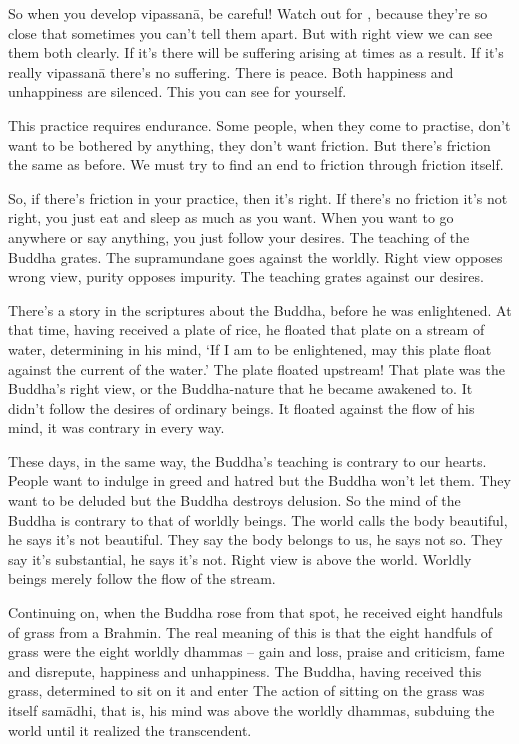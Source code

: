 So when you develop vipassan\=a, be careful! Watch out for , because they're so close that sometimes you can't tell them apart. But with right view we can see them both clearly. If it's  there will be suffering arising at times as a result. If it's really vipassan\=a there's no suffering. There is peace. Both happiness and unhappiness are silenced. This you can see for yourself. 

This practice requires endurance. Some people, when they come to practise, don't want to be bothered by anything, they don't want friction. But there's friction the same as before. We must try to find an end to friction through friction itself. 

So, if there's friction in your practice, then it's right. If there's no friction it's not right, you just eat and sleep as much as you want. When you want to go anywhere or say anything, you just follow your desires. The teaching of the Buddha grates. The supramundane goes against the worldly. Right view opposes wrong view, purity opposes impurity. The teaching grates against our desires. 

There's a story in the scriptures about the Buddha, before he was enlightened. At that time, having received a plate of rice, he floated that plate on a stream of water, determining in his mind, `If I am to be enlightened, may this plate float against the current of the water.' The plate floated upstream! That plate was the Buddha's right view, or the Buddha-nature that he became awakened to. It didn't follow the desires of ordinary beings. It floated against the flow of his mind, it was contrary in every way. 

These days, in the same way, the Buddha's teaching is contrary to our hearts. People want to indulge in greed and hatred but the Buddha won't let them. They want to be deluded but the Buddha destroys delusion. So the mind of the Buddha is contrary to that of worldly beings. The world calls the body beautiful, he says it's not beautiful. They say the body belongs to us, he says not so. They say it's substantial, he says it's not. Right view is above the world. Worldly beings merely follow the flow of the stream. 

Continuing on, when the Buddha rose from that spot, he received eight handfuls of grass from a Brahmin. The real meaning of this is that the eight handfuls of grass were the eight worldly dhammas -- gain and loss, praise and criticism, fame and disrepute, happiness and unhappiness. The Buddha, having received this grass, determined to sit on it and enter  The action of sitting on the grass was itself sam\=adhi, that is, his mind was above the worldly dhammas, subduing the world until it realized the transcendent. 

